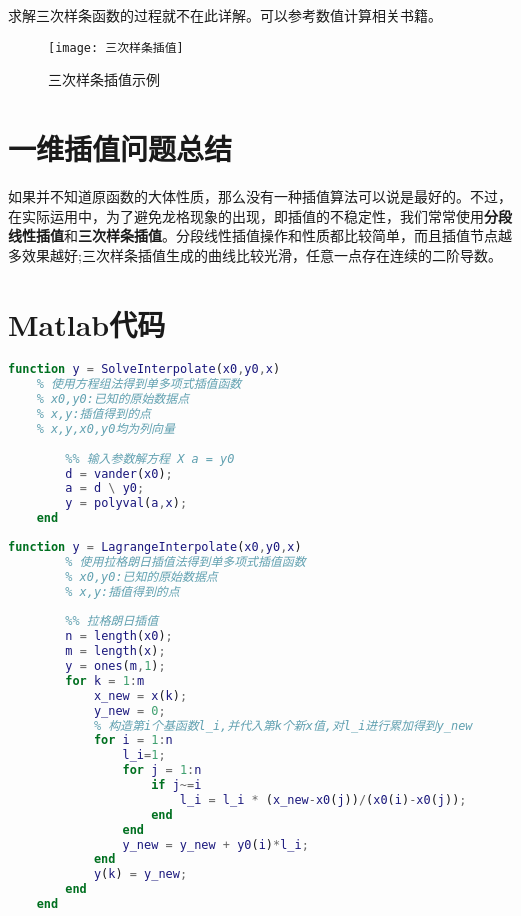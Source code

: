 \documentclass[withoutpreface]{cumcmthesis}
\begin{document}
求解三次样条函数的过程就不在此详解。可以参考数值计算相关书籍。

\begin{figure}[H]
    \centering
    \texttt{[image: 三次样条插值]}
    \vspace{-0.3cm}
    \caption{三次样条插值示例}
\end{figure}

\section{一维插值问题总结}

如果并不知道原函数的大体性质，那么没有一种插值算法可以说是最好的。不过，在实际运用中，为了避免龙格现象的出现，即插值的不稳定性，我们常常使用\textbf{分段线性插值}和\textbf{三次样条插值}。分段线性插值操作和性质都比较简单，而且插值节点越多效果越好;三次样条插值生成的曲线比较光滑，任意一点存在连续的二阶导数。

\appendix

\section{Matlab代码}

\begin{lstlisting}[language=matlab ,caption={待定系数方程组法} ]
    function y = SolveInterpolate(x0,y0,x)
    % 使用方程组法得到单多项式插值函数
    % x0,y0:已知的原始数据点
    % x,y:插值得到的点
    % x,y,x0,y0均为列向量
    
        %% 输入参数解方程 X a = y0 
        d = vander(x0);
        a = d \ y0;
        y = polyval(a,x);
    end
    \end{lstlisting}

\begin{lstlisting}[language=matlab ,caption={拉格朗日插值法} ]
    function y = LagrangeInterpolate(x0,y0,x)
        % 使用拉格朗日插值法得到单多项式插值函数
        % x0,y0:已知的原始数据点
        % x,y:插值得到的点
        
        %% 拉格朗日插值
        n = length(x0);
        m = length(x);
        y = ones(m,1);
        for k = 1:m
            x_new = x(k);
            y_new = 0;
            % 构造第i个基函数l_i,并代入第k个新x值,对l_i进行累加得到y_new
            for i = 1:n
                l_i=1;
                for j = 1:n
                    if j~=i
                        l_i = l_i * (x_new-x0(j))/(x0(i)-x0(j));
                    end
                end
                y_new = y_new + y0(i)*l_i;
            end
            y(k) = y_new;
        end
    end
    \end{lstlisting}
\end{document}
